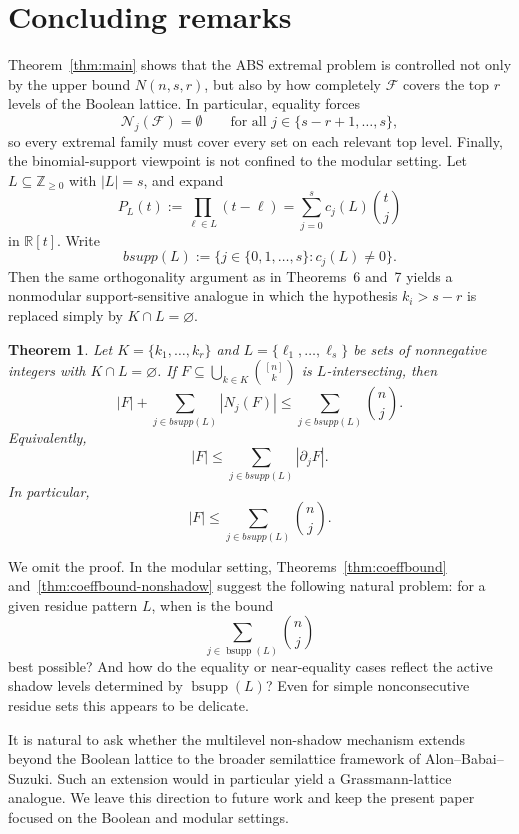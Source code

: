 \documentclass[11pt]{article}
\theoremstyle{plain}
\newtheorem{theorem}{Theorem}
\theoremstyle{remark}
\newcommand{\F}{\mathcal{F}}
\newcommand{\N}{\mathcal{N}}
\newcommand{\bsupp}{\operatorname{bsupp}}
\begin{document}
\section{Concluding remarks}

Theorem~\ref{thm:main} shows that the ABS extremal problem is controlled not only by the upper bound
$N(n,s,r)$, but also by how completely $\F$ covers the top $r$ levels of the Boolean lattice.
In particular, equality forces
$$
  \N_j(\F)=\emptyset \qquad \text{for all } j\in\{s-r+1,\dots,s\},
$$
so every extremal family must cover every set on each relevant top level.
Finally, the binomial-support viewpoint is not confined to the modular setting. Let
\(L \subseteq \mathbb Z_{\ge 0}\) with \(|L|=s\), and expand
$$
P_L(t):=\prod_{\ell\in L}(t-\ell)=\sum_{j=0}^{s} c_j(L)\binom{t}{j}
$$
in \(\mathbb R[t]\). Write
$$
bsupp(L):=\{j\in\{0,1,\ldots,s\}: c_j(L)\neq 0\}.
$$
Then the same orthogonality argument as in Theorems~6 and~7 yields a nonmodular
support-sensitive analogue in which the hypothesis \(k_i>s-r\) is replaced simply by
\(K\cap L=\varnothing\).

\begin{theorem}
Let \(K=\{k_1,\ldots,k_r\}\) and \(L=\{\ell_1,\ldots,\ell_s\}\) be sets of nonnegative integers with
\(K\cap L=\varnothing\). If \(F \subseteq \bigcup_{k\in K}\binom{[n]}{k}\) is \(L\)-intersecting, then
$$
|F|+\sum_{j\in bsupp(L)} |N_j(F)|
\le
\sum_{j\in bsupp(L)} \binom{n}{j}.
$$
Equivalently,
$$
|F|\le \sum_{j\in bsupp(L)} |\partial_jF|.
$$
In particular,
$$
|F|\le \sum_{j\in bsupp(L)} \binom{n}{j}.
$$
\end{theorem}

We omit the proof.
In the modular setting, Theorems~\ref{thm:coeffbound} and~\ref{thm:coeffbound-nonshadow} suggest the following natural problem:
for a given residue pattern $L$, when is the bound
$$\sum_{j\in\bsupp(L)}\binom{n}{j}$$
best possible? And how do the equality or near-equality cases reflect the active shadow levels determined by
$\bsupp(L)$?
Even for simple nonconsecutive residue sets this appears to be delicate.

It is natural to ask whether the multilevel non-shadow mechanism extends beyond the Boolean lattice
to the broader semilattice framework of Alon--Babai--Suzuki.
Such an extension would in particular yield a Grassmann-lattice analogue.
We leave this direction to future work and keep the present paper focused on the Boolean
and modular settings.
\end{document}
